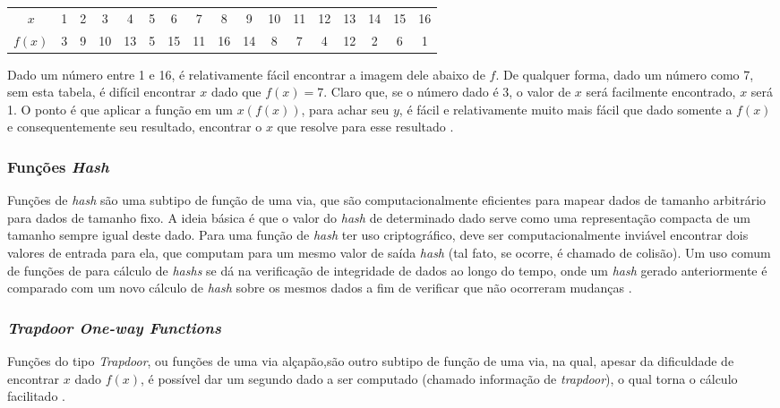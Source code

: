 \documentclass[
	article,			%
	11pt,				%
	oneside,			%
	a4paper,			%
	chapter=TITLE,		%
	section=TITLE,		%
	subsection=TITLE,	%
	subsubsection=TITLE, %
	english,			%
	brazil,				%
	sumario=tradicional
	]{ifrs-artigo-abntex2}
\begin{document}
\begin{table}[htb]
  \begin{center}
    \label{tabela-oneway}
    \begin{tabular}{|c|c|c|c|c|c|c|c|c|c|c|c|c|c|c|c|c|}
      \hline
      $x$ & 1 & 2 & 3 & 4 & 5 & 6 & 7 & 8 & 9 & 10 & 11 & 12 & 13 & 14 & 15 & 16 \\
      $f(x)$ & 3 & 9 & 10 & 13 & 5 & 15 & 11 & 16 & 14 & 8 & 7 & 4 & 12 & 2 & 6 & 1 \\
      \hline
    \end{tabular}
  \end{center}
\end{table}

Dado um número entre 1 e 16, é relativamente fácil encontrar a imagem dele abaixo de $f$. De qualquer forma, dado um número como 7, sem esta tabela, é difícil encontrar $x$ dado que $f(x) = 7$. Claro que, se o número dado é 3, o valor de $x$ será facilmente encontrado, $x$ será 1. O ponto é que aplicar a função em um $x (f(x))$, para achar seu $y$, é fácil e relativamente muito mais fácil que dado somente a $f(x)$ e consequentemente seu resultado, encontrar o $x$ que resolve para esse resultado \cite{katz1996handbook}.

\subsubsection{Funções \textit{Hash}}
Funções de \textit{hash} são uma subtipo de função de uma via, que são computacionalmente eficientes para mapear dados de tamanho arbitrário para dados de tamanho fixo. A ideia básica é que o valor do \textit{hash} de determinado dado serve como uma representação compacta de um tamanho sempre igual deste dado. Para uma função de \textit{hash} ter uso criptográfico, deve ser computacionalmente inviável encontrar dois valores de entrada para ela, que computam para um mesmo valor de saída \textit{hash} (tal fato, se ocorre, é chamado de colisão). Um uso comum de funções de para cálculo de \textit{hashs} se dá na verificação de integridade de dados ao longo do tempo, onde um \textit{hash} gerado anteriormente é comparado com um novo cálculo de \textit{hash} sobre os mesmos dados a fim de verificar que não ocorreram mudanças \cite{katz1996handbook}.

\subsubsection{\textit{Trapdoor One-way Functions}}
Funções do tipo \textit{Trapdoor}, ou funções de uma via alçapão,são outro subtipo de função de uma via, na qual, apesar da dificuldade de encontrar $x$ dado $f(x)$, é possível dar um segundo dado a ser computado (chamado informação de \textit{trapdoor}), o qual torna o cálculo facilitado \cite{katz1996handbook}.
\end{document}
